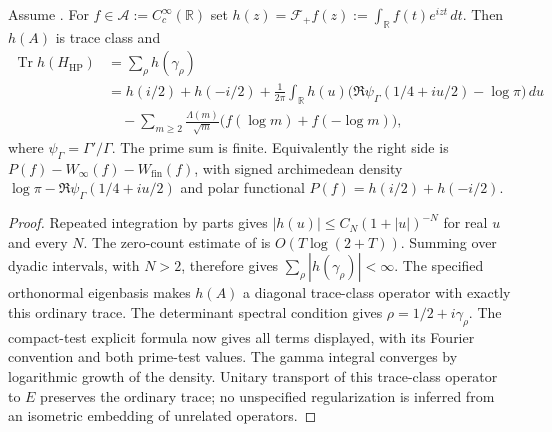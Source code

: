 \begin{proposition}
\label{v4-arith:w5-b:prop:weil-trace}
Assume . For
$f\in\mathcal A:=C_c^\infty(\mathbb R)$ set
$h(z)=\mathcal F_+f(z):=\int_{\mathbb R}f(t)e^{izt}\,dt$.
Then $h(A)$ is trace class and
\begin{equation}
\label{v4-arith:w5-b:eq:trace-identity}
\begin{aligned}
 \operatorname{Tr}h(H_{\mathrm{HP}})
 &=\sum_\rho h(\gamma_\rho)\\
 &=h(i/2)+h(-i/2)
   +\frac1{2\pi}\int_{\mathbb R}h(u)
       \bigl(\Re\psi_\Gamma(1/4+iu/2)-\log\pi\bigr)\,du\\
 &\hspace{1em}-\sum_{m\geq2}\frac{\Lambda(m)}{\sqrt m}
       \bigl(f(\log m)+f(-\log m)\bigr),
\end{aligned}
\end{equation}
where $\psi_\Gamma=\Gamma'/\Gamma$. The prime sum is finite.
Equivalently the right side is $P(f)-W_\infty(f)-W_{\mathrm{fin}}(f)$,
with signed archimedean density
$\log\pi-\Re\psi_\Gamma(1/4+iu/2)$ and polar functional
$P(f)=h(i/2)+h(-i/2)$.
\end{proposition}
\begin{proof}
Repeated integration by parts gives
$|h(u)|\leq C_N(1+|u|)^{-N}$ for real $u$ and every $N$.
The zero-count estimate of  is
$O(T\log(2+T))$. Summing over dyadic intervals, with $N>2$,
therefore gives $\sum_\rho|h(\gamma_\rho)|<\infty$.
The specified orthonormal eigenbasis makes $h(A)$ a diagonal
trace-class operator with exactly this ordinary trace.
The determinant spectral condition gives
$\rho=1/2+i\gamma_\rho$. The compact-test explicit formula
 now gives all terms displayed, with its
Fourier convention and both prime-test values. The gamma integral
converges by logarithmic growth of the density. Unitary transport
of this trace-class operator to $E$ preserves the ordinary trace;
no unspecified regularization is inferred from an isometric
embedding of unrelated operators.
\end{proof}

